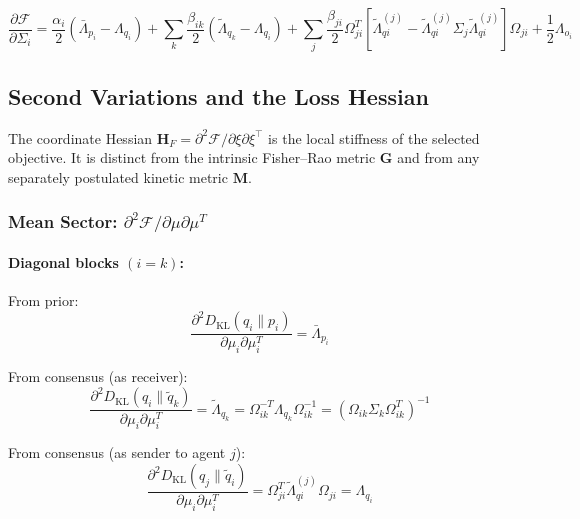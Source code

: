\documentclass[12pt]{article}
\begin{document}
\begin{equation}
\boxed{
\frac{\partial \mathcal{F}}{\partial \Sigma_i} = \frac{\alpha_i}{2}(\bar{\Lambda}_{p_i} - \Lambda_{q_i}) + \sum_k \frac{\beta_{ik}}{2}(\tilde{\Lambda}_{q_k} - \Lambda_{q_i}) + \sum_j \frac{\beta_{ji}}{2}\Omega_{ji}^T\left[\tilde{\Lambda}_{qi}^{(j)} - \tilde{\Lambda}_{qi}^{(j)}\Sigma_j\tilde{\Lambda}_{qi}^{(j)}\right]\Omega_{ji} + \frac{1}{2}\Lambda_{o_i}
}
\label{eq:total_gradient_sigma}
\end{equation}

\subsection{Second Variations and the Loss Hessian}

The coordinate Hessian $\mathbf H_F=\partial^2\mathcal F/\partial\xi\partial\xi^\top$ is the local stiffness of the selected objective. It is distinct from the intrinsic Fisher--Rao metric $\mathbf G$ and from any separately postulated kinetic metric $\mathbf M$.

\subsubsection{Mean Sector: $\partial^2\mathcal{F}/\partial\mu\partial\mu^T$}

\paragraph{Diagonal blocks $(i = k)$:}

From prior:
\begin{equation}
\frac{\partial^2 D_{\mathrm{KL}}(q_i \| p_i)}{\partial \mu_i \partial \mu_i^T} = \bar{\Lambda}_{p_i}
\end{equation}

From consensus (as receiver):
\begin{equation}
\frac{\partial^2 D_{\mathrm{KL}}(q_i \| \tilde{q}_k)}{\partial \mu_i \partial \mu_i^T} = \tilde{\Lambda}_{q_k} = \Omega_{ik}^{-T}\Lambda_{q_k}\Omega_{ik}^{-1} = \left(\Omega_{ik}\Sigma_k\Omega_{ik}^T\right)^{-1}
\end{equation}

From consensus (as sender to agent $j$):
\begin{equation}
\frac{\partial^2 D_{\mathrm{KL}}(q_j \| \tilde{q}_i)}{\partial \mu_i \partial \mu_i^T} = \Omega_{ji}^T\tilde{\Lambda}_{qi}^{(j)}\Omega_{ji} = \Lambda_{q_i}
\end{equation}
\end{document}

